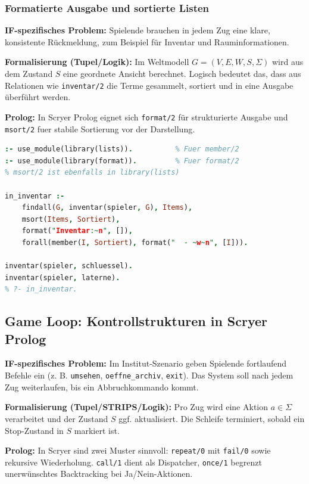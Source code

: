 \documentclass[parskip=half,a4paper,11pt]{scrreprt}
\begin{document}
\subsubsection{Formatierte Ausgabe und sortierte Listen}

\textbf{IF-spezifisches Problem:} Spielende brauchen in jedem Zug eine klare, konsistente Rückmeldung, zum Beispiel für Inventar und Rauminformationen.

\textbf{Formalisierung (Tupel/Logik):} Im Weltmodell $G=(V,E,W,S,\Sigma)$ wird aus dem Zustand $S$ eine geordnete Ansicht berechnet. Logisch bedeutet das, dass aus Relationen wie \texttt{inventar/2} die Terme gesammelt, sortiert und in eine Ausgabe überführt werden.

\textbf{Prolog:} In Scryer Prolog eignet sich \texttt{format/2} für strukturierte Ausgabe und \texttt{msort/2} fuer stabile Sortierung vor der Darstellung.

\begin{lstlisting}[language=Prolog, caption={}]
:- use_module(library(lists)).          % Fuer member/2
:- use_module(library(format)).         % Fuer format/2
% msort/2 ist ebenfalls in library(lists)

in_inventar :-
    findall(G, inventar(spieler, G), Items),
    msort(Items, Sortiert),
    format("Inventar:~n", []),
    forall(member(I, Sortiert), format("  - ~w~n", [I])).

inventar(spieler, schluessel).
inventar(spieler, laterne).
% ?- in_inventar.
\end{lstlisting}

\subsection{Game Loop: Kontrollstrukturen in Scryer Prolog}

\textbf{IF-spezifisches Problem:} Im Institut-Szenario geben Spielende fortlaufend Befehle ein (z. B. \texttt{umsehen}, \texttt{oeffne\_archiv}, \texttt{exit}). Das System soll nach jedem Zug weiterlaufen, bis ein Abbruchkommando kommt.

\textbf{Formalisierung (Tupel/STRIPS/Logik):} Pro Zug wird eine Aktion $a \in \Sigma$ verarbeitet und der Zustand $S$ ggf. aktualisiert. Die Schleife terminiert, sobald ein Stop-Zustand in $S$ markiert ist.

\textbf{Prolog:} In Scryer sind zwei Muster sinnvoll: \texttt{repeat/0} mit \texttt{fail/0} sowie rekursive Wiederholung. \texttt{call/1} dient als Dispatcher, \texttt{once/1} begrenzt unerwünschtes Backtracking bei Ja/Nein-Aktionen.
\end{document}
